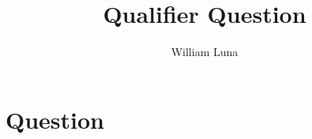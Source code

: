 \documentclass[
	letterpaper, %
]{jdf}
\author{William Luna}
\title{Qualifier Question}
\begin{document}

\maketitle




\section{Question}
\end{document}
